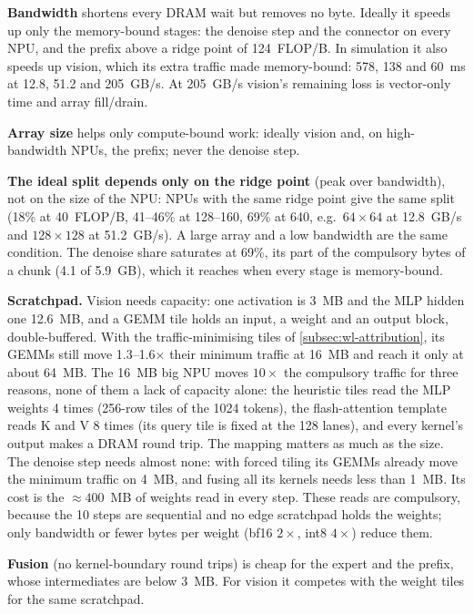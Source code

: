\begin{dashlist}
  \item \textbf{Bandwidth} shortens every DRAM wait but removes no byte. Ideally it speeds up only the memory-bound stages: the denoise step and the connector on every NPU, and the prefix above a ridge point of 124~FLOP/B. In simulation it also speeds up vision, which its extra traffic made memory-bound: 578, 138 and 60~ms at 12.8, 51.2 and 205~GB/s. At 205~GB/s vision's remaining loss is vector-only time and array fill/drain.
  \item \textbf{Array size} helps only compute-bound work: ideally vision and, on high-bandwidth NPUs, the prefix; never the denoise step.
  \item \textbf{The ideal split depends only on the ridge point} (peak over bandwidth), not on the size of the NPU: NPUs with the same ridge point give the same split (18\% at 40~FLOP/B, 41--46\% at 128--160, 69\% at 640, e.g.\ $64{\times}64$ at 12.8~GB/s and $128{\times}128$ at 51.2~GB/s). A large array and a low bandwidth are the same condition. The denoise share saturates at 69\%, its part of the compulsory bytes of a chunk (4.1 of 5.9~GB), which it reaches when every stage is memory-bound.
  \item \textbf{Scratchpad.} Vision needs capacity: one activation is 3~MB and the MLP hidden one 12.6~MB, and a GEMM tile holds an input, a weight and an output block, double-buffered. With the traffic-minimising tiles of \cref{subsec:wl-attribution}, its GEMMs still move 1.3--1.6$\times$ their minimum traffic at 16~MB and reach it only at about 64~MB. The 16~MB big NPU moves $10\times$ the compulsory traffic for three reasons, none of them a lack of capacity alone: the heuristic tiles read the MLP weights 4 times (256-row tiles of the 1024 tokens), the flash-attention template reads K and V 8 times (its query tile is fixed at the 128 lanes), and every kernel's output makes a DRAM round trip. The mapping matters as much as the size. The denoise step needs almost none: with forced tiling its GEMMs already move the minimum traffic on 4~MB, and fusing all its kernels needs less than 1~MB. Its cost is the ${\approx}400$~MB of weights read in every step. These reads are compulsory, because the 10 steps are sequential and no edge scratchpad holds the weights; only bandwidth or fewer bytes per weight (bf16 $2\times$, int8 $4\times$) reduce them.
  \item \textbf{Fusion} (no kernel-boundary round trips) is cheap for the expert and the prefix, whose intermediates are below 3~MB. For vision it competes with the weight tiles for the same scratchpad.
\end{dashlist}

